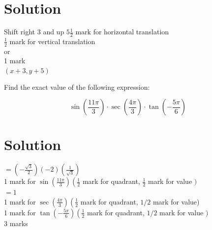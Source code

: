 \documentclass[10pt]{article}
\begin{document}
\section*{Solution}
Shift right 3 and up $5 \frac{1}{2}$ mark for horizontal translation\\
$\frac{1}{2}$ mark for vertical translation\\
or\\
1 mark\\
$(x+3, y+5)$

Find the exact value of the following expression:

$$
\sin \left(\frac{11 \pi}{3}\right) \cdot \sec \left(\frac{4 \pi}{3}\right) \cdot \tan \left(-\frac{5 \pi}{6}\right)
$$

\section*{Solution}
$=\left(-\frac{\sqrt{3}}{2}\right)(-2)\left(\frac{1}{\sqrt{3}}\right)$\\
1 mark for $\sin \left(\frac{11 \pi}{3}\right)\left(\frac{1}{2}\right.$ mark for quadrant, $\frac{1}{2}$ mark for value $)$\\
$=1$\\
1 mark for $\sec \left(\frac{4 \pi}{3}\right)\left(\frac{1}{2}\right.$ mark for quadrant, $1 / 2$ mark for value)\\
1 mark for $\tan \left(-\frac{5 \pi}{6}\right)\left(\frac{1}{2}\right.$ mark for quadrant, $1 / 2$ mark for value $)$\\
3 marks
\end{document}
